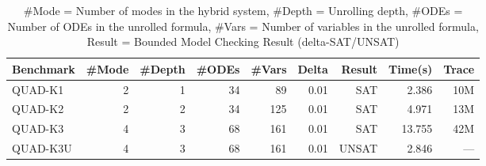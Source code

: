 \documentclass[10pt]{article}
\theoremstyle{definition}
\begin{document}
\begin{table}[!th]
  \centering
  \small
  \begin{tabular}{|l|r|r|r|r|r|r|r|r|}
    \hline
    Benchmark    & \#Mode& \#Depth & \#ODEs & \#Vars  & Delta  & Result       & Time(s) & Trace \\
    \hline
    \hline
    QUAD-K1  & 2   & 1          & 34     & 89      & 0.01      & SAT & 2.386 &  10M \\
    QUAD-K2  & 2   & 2          & 34     & 125     & 0.01      & SAT & 4.971 &  13M \\
    QUAD-K3  & 4   & 3          & 68     & 161     & 0.01      & SAT & 13.755 & 42M \\
    QUAD-K3U & 4   & 3          & 68     & 161     & 0.01      & UNSAT & 2.846 & --- \\
    \hline
    \hline
  \end{tabular}
  \caption{\small
    \#Mode = Number of modes in the hybrid system,
    \#Depth = Unrolling depth,
    \#ODEs = Number of ODEs in the unrolled formula,
    \#Vars = Number of variables in the unrolled formula,
    Result = Bounded Model Checking Result (delta-SAT/UNSAT)}\label{tbl:exp}
\end{table}
\end{document}

